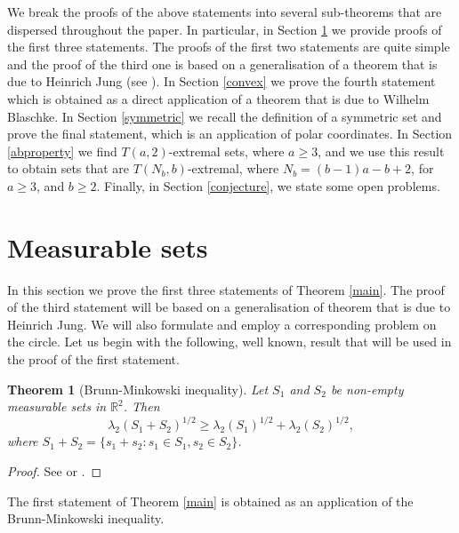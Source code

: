\documentclass[12pt]{article}
\newtheorem{thm}{Theorem}[section]
\begin{document}
We break the proofs of the above statements into several sub-theorems that are dispersed  throughout the paper. 
In particular, in Section \ref{general} we  provide proofs of the first three statements. 
The proofs of the first two statements are quite simple and the proof of the third one is 
based on a generalisation of a theorem that is due to Heinrich Jung (see \cite{Jung}). 
In Section \ref{convex} we prove the fourth statement which is obtained as a direct application 
of a theorem that is due to Wilhelm Blaschke. In Section \ref{symmetric} we recall the definition 
of a symmetric set and  prove the final statement, which is
an application of polar coordinates. 
In Section \ref{abproperty}  we find
$T(a,2)$-extremal sets, where $a\geq 3$, and we use this result to obtain sets that are
$T(N_b,b)$-extremal, where $N_b= (b-1)a-b+2$, for $a\geq 3$, and $b\geq 2$.
Finally, in Section \ref{conjecture}, we state some 
open problems.


\section{Measurable sets}\label{general}

In this section we prove the first three statements of Theorem \ref{main}. 
The proof of the third statement will be based on a generalisation of theorem that is due to Heinrich Jung. 
We will also formulate and employ a 
corresponding problem on the circle. 
Let us begin with the following, well known, result that will be used in the proof of the first statement. 


\begin{thm}[Brunn-Minkowski inequality] Let $S_1$ and $S_2$ be non-empty measurable sets in $\mathbb{R}^2$. 
Then
\[ \lambda_2(S_1+S_2)^{1/2} \geq \lambda_2(S_1)^{1/2} + \lambda_2(S_2)^{1/2} , \]
where $S_1+S_2=\{s_1+s_2: s_1\in S_1,s_2\in S_2\}$.
\end{thm}
\begin{proof} See \cite{Gruber} or \cite{Matousek}.
\end{proof}

The first statement of Theorem \ref{main} is obtained as an 
application of the Brunn-Minkowski inequality. 
\end{document}
